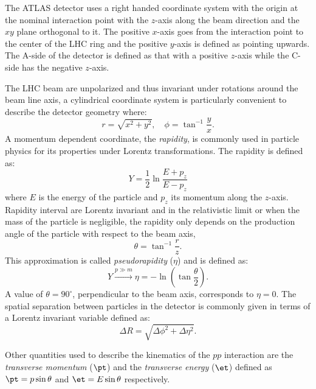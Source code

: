 The ATLAS detector uses a right handed coordinate system with the origin at the
nominal interaction point with the $z$-axis along the beam direction and the
$xy$ plane orthogonal to it. The positive $x$-axis goes from the interaction
point to the center of the LHC ring and the positive $y$-axis is defined as
pointing upwards. The A-side of the detector is defined as that with a positive
$z$-axis while the C-side has the negative $z$-axis.

The LHC beam are unpolarized and thus invariant under rotations around the beam
line axis, a cylindrical coordinate system is particularly convenient to
describe the detector geometry where:
\begin{equation}
  \label{eq:57}
  r = \sqrt{x^2 + y^2}, \quad \phi = \tan^{-1} \frac{y}{x}.
\end{equation}
A momentum dependent coordinate, the \emph{rapidity}, is commonly used in
particle physics for its properties under Lorentz transformations. The rapidity
is defined as:
\begin{equation}
  \label{eq:58}
  Y = \frac{1}{2} \ln \frac{E + p_z}{E - p_z}
\end{equation}
where $E$ is the energy of the particle and $p_z$ its momentum along the
$z$-axis. Rapidity interval are Lorentz invariant and in the relativistic limit
or when the mass of the particle is negligible, the rapidity only depends on the
production angle of the particle with respect to the beam axis,
\begin{equation}
  \label{eq:59}
  \theta = \tan^{-1} \frac{r}{z}.
\end{equation}
This approximation is called \emph{pseudorapidity} ($\eta$) and is defined as:
\begin{equation}
  \label{eq:60}
  Y \xrightarrow{p \gg m} \eta = - \ln \left( \tan \frac{\theta}{2} \right).
\end{equation}
A value of $\theta = 90^{\circ}$, perpendicular to the beam axis, corresponds to
$\eta = 0$. The spatial separation between particles in the detector is commonly
given in terms of a Lorentz invariant variable defined as:
\begin{equation}
  \label{eq:61}
  \Delta R = \sqrt{\Delta \phi^2 + \Delta \eta^2}.
\end{equation}

Other quantities used to describe the kinematics of the $pp$ interaction are the
\emph{transverse momentum} ($\pt$) and the \emph{transverse energy} ($\et$)
defined as $\pt = p \sin \theta$ and $\et = E \sin \theta$ respectively.
